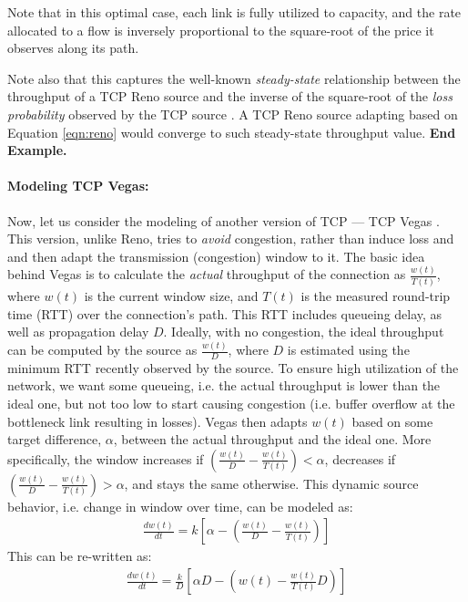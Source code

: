 \documentclass{article}
\begin{document}
Note that in this optimal case, each link is fully utilized to capacity, and 
the rate allocated to a flow is inversely proportional to the square-root of the price it observes along its path.

Note also that this captures the well-known {\em steady-state} relationship between the throughput of a TCP Reno source and the inverse of the square-root of the {\em loss probability} observed by the TCP source \cite{tcp-thru:2000}.
A TCP Reno source adapting based on Equation \ref{eqn:reno} would converge to such steady-state throughput value.
{\bf End Example.}\\


\paragraph{Modeling TCP Vegas:} 
Now, let us consider the modeling of another version of TCP --- TCP Vegas \cite{vegas:1995}.
This version, unlike Reno, tries to {\em avoid} congestion, rather than induce loss and 
and then adapt the transmission (congestion) window to it.  
The basic idea behind Vegas is to calculate the {\em actual} throughput of the connection
as $\frac{w(t)}{T(t)}$, where $w(t)$ is the current window size,
and $T(t)$ is the measured round-trip time (RTT) over the connection's path.
This RTT includes queueing delay, as well as propagation delay $D$.
Ideally, with no congestion, the ideal throughput can be computed by the source
as $\frac{w(t)}{D}$, where $D$ is estimated using the minimum RTT recently observed by the source.
To ensure high utilization of the network, we want some queueing, i.e. 
the actual throughput is lower than the ideal one, but not too low to start causing congestion (i.e. buffer overflow
at the bottleneck link resulting in losses).
Vegas then adapts $w(t)$ based on some target difference, $\alpha$, 
between the actual throughput and the ideal one.
More specifically,
the window increases if $(\frac{w(t)}{D} - \frac{w(t)}{T(t)}) < \alpha$,
decreases if $(\frac{w(t)}{D} - \frac{w(t)}{T(t)}) > \alpha$,
and stays the same otherwise. This dynamic source behavior,
i.e. change in window over time, can be modeled as:
\begin{eqnarray*}
\frac{dw(t)}{dt} = k [\alpha - (\frac{w(t)}{D} - \frac{w(t)}{T(t)})]
\end{eqnarray*}
This can be re-written as:
\begin{eqnarray*}
\frac{dw(t)}{dt} = \frac{k}{D} [\alpha D - (w(t) - \frac{w(t)}{T(t)}D)]
\end{eqnarray*}
\end{document}
